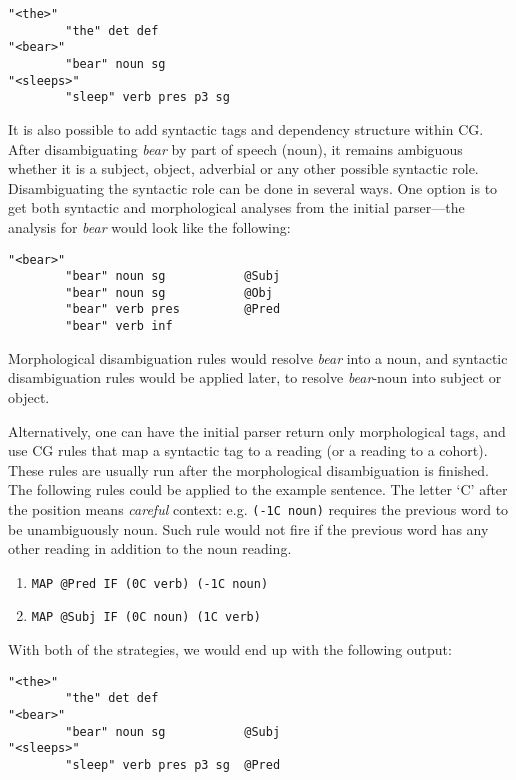 \begin{verbatim}
"<the>"
        "the" det def
"<bear>"
        "bear" noun sg
"<sleeps>"
        "sleep" verb pres p3 sg
\end{verbatim}

It is also possible to add syntactic tags and dependency structure within CG. 
After disambiguating \emph{bear} by part of speech (noun), it
remains ambiguous whether it is a subject, object, adverbial or
any other possible syntactic role.
Disambiguating the syntactic role can be done in several ways. One option is to get both
syntactic and morphological analyses from the initial parser---the analysis
for \emph{bear} would look like the following:

\begin{verbatim}
"<bear>"
        "bear" noun sg           @Subj
        "bear" noun sg           @Obj
        "bear" verb pres         @Pred
        "bear" verb inf 
\end{verbatim}

\noindent Morphological disambiguation rules would
resolve \emph{bear} into a noun, and syntactic disambiguation rules
would be applied later, to resolve \emph{bear}-noun into subject or object.

Alternatively, one can have the initial parser return only
morphological tags, and use CG rules that map a syntactic tag to a
reading (or a reading to a cohort).
These rules are usually run after the morphological disambiguation is
finished.
The following rules could be applied to the example sentence. The
letter `C' after the position means \emph{careful} context: e.g. 
\texttt{(-1C noun)} requires the previous word to be unambiguously
noun. Such rule would not fire if the previous word has any other
reading in addition to the noun reading.

\begin{enumerate}
\itemsep1pt\parskip0pt
\item[] \texttt{MAP @Pred IF (0C verb) (-1C noun)}
\item[] \texttt{MAP @Subj IF (0C noun) (1C verb)}
\end{enumerate}

\noindent With both of the strategies, we would end up with the
following output:

\begin{verbatim}
"<the>"
        "the" det def            
"<bear>"
        "bear" noun sg           @Subj 
"<sleeps>"
        "sleep" verb pres p3 sg  @Pred

\end{verbatim}

